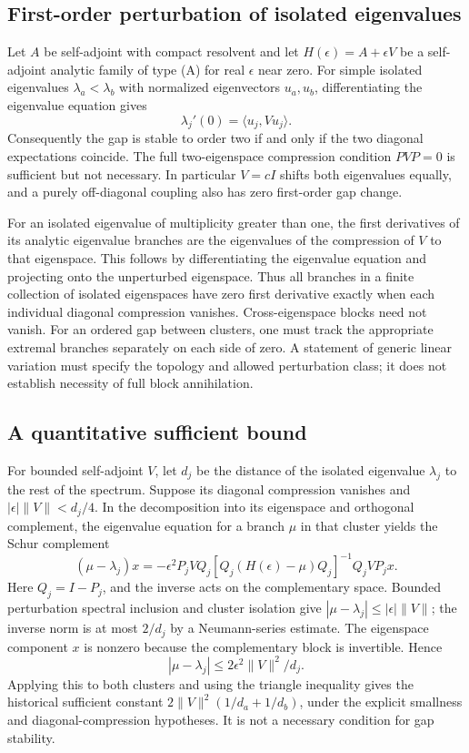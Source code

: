 \subsection{First-order perturbation of isolated eigenvalues}
Let $A$ be self-adjoint with compact resolvent and let $H(\epsilon)=A+\epsilon V$ be a self-adjoint analytic family of type (A) for real $\epsilon$ near zero. For simple isolated eigenvalues $\lambda_a<\lambda_b$ with normalized eigenvectors $u_a,u_b$, differentiating the eigenvalue equation gives
\[
\lambda_j'(0)=\langle u_j,Vu_j\rangle.
\]
Consequently the gap is stable to order two if and only if the two diagonal expectations coincide. The full two-eigenspace compression condition $PVP=0$ is sufficient but not necessary. In particular $V=cI$ shifts both eigenvalues equally, and a purely off-diagonal coupling also has zero first-order gap change.

For an isolated eigenvalue of multiplicity greater than one, the first derivatives of its analytic eigenvalue branches are the eigenvalues of the compression of $V$ to that eigenspace. This follows by differentiating the eigenvalue equation and projecting onto the unperturbed eigenspace. Thus all branches in a finite collection of isolated eigenspaces have zero first derivative exactly when each individual diagonal compression vanishes. Cross-eigenspace blocks need not vanish. For an ordered gap between clusters, one must track the appropriate extremal branches separately on each side of zero. A statement of generic linear variation must specify the topology and allowed perturbation class; it does not establish necessity of full block annihilation.

\subsection{A quantitative sufficient bound}
For bounded self-adjoint $V$, let $d_j$ be the distance of the isolated eigenvalue $\lambda_j$ to the rest of the spectrum. Suppose its diagonal compression vanishes and $|\epsilon|\|V\|<d_j/4$. In the decomposition into its eigenspace and orthogonal complement, the eigenvalue equation for a branch $\mu$ in that cluster yields the Schur complement
\[
(\mu-\lambda_j)x
=-\epsilon^2 P_{j} V Q_{j}
{[Q_{j}(H(\epsilon)-\mu)Q_{j}]}^{-1}Q_{j} V P_{j} x.
\]
Here $Q_j=I-P_j$, and the inverse acts on the complementary space. Bounded perturbation spectral inclusion and cluster isolation give $|\mu-\lambda_j|\le|\epsilon|\|V\|$; the inverse norm is at most $2/d_j$ by a Neumann-series estimate. The eigenspace component $x$ is nonzero because the complementary block is invertible. Hence
\[
|\mu-\lambda_j|\le 2\epsilon^2\|V\|^2/d_j.
\]
Applying this to both clusters and using the triangle inequality gives the historical sufficient constant $2\|V\|^2(1/d_a+1/d_b)$, under the explicit smallness and diagonal-compression hypotheses. It is not a necessary condition for gap stability.

